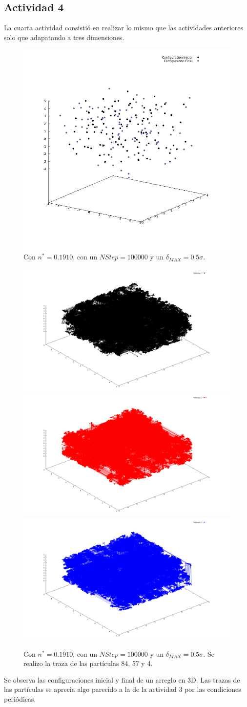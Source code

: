 \documentclass[12pt,letterpaper]{article}
\begin{document}
\subsection*{Actividad 4}
La cuarta actividad consistió en realizar lo mismo que las actividades anteriores solo que adapatando a tres dimensiones.
	\begin{figure}[H]
		\centering
		\includegraphics[width=0.5\linewidth]{ConfigS3D.png}
		\caption{ Con $n^*=0.1910$, con un $NStep=100000$ y un $\delta_{MAX}=0.5\sigma$.}
	\end{figure}
	\begin{figure}[H]
		\centering
		\includegraphics[width=0.49\linewidth]{Part1.png}
		\includegraphics[width=0.49\linewidth]{Part2.png}
		\includegraphics[width=0.49\linewidth]{Part3.png}
		\caption{Con $n^*=0.1910$, con un $NStep=100000$ y un $\delta_{MAX}=0.5\sigma$. Se realizo la traza de las partículas 84, 57 y 4.}
	\end{figure}
Se observa las configuraciones inicial y final de un arreglo en 3D. Las trazas de las partículas se aprecia algo parecido a la de la actividad 3 por las condiciones periódicas.
\end{document}
